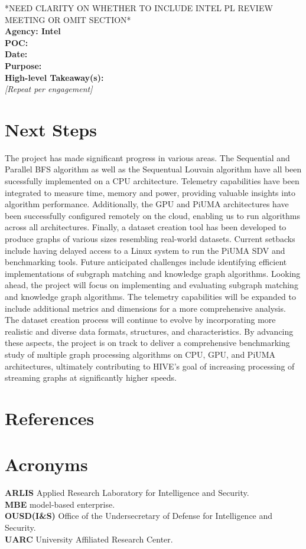 \documentclass[letterpaper, 10pt]{article}
\begin{document}
\begin{multicols}{2}
        *NEED CLARITY ON WHETHER TO INCLUDE INTEL PL REVIEW MEETING OR OMIT SECTION*\\
        \textbf{Agency: Intel} \\  
        \textbf{POC:}  \\
        \textbf{Date:} \\
        \textbf{Purpose:} \\
        \textbf{High-level Takeaway(s):} \\ 
        \textit{[Repeat per engagement]} 

    \section{Next Steps}
        The project has made significant progress in various areas. The Sequential and Parallel BFS algorithm as well as the Sequentual Louvain algorithm have all been sucessfully implemented on a CPU architecture. Telemetry capabilities have been integrated to measure time, memory and power, providing valuable insights into algorithm performance. Additionally, the GPU and PiUMA architectures have been successfully configured remotely on the cloud, enabling us to run algorithms across all architectures. Finally, a dataset creation tool has been developed to produce graphs of various sizes resembling real-world datasets. Current setbacks include having delayed access to a Linux system to run the PiUMA SDV and benchmarking tools. Future anticipated challenges include identifying efficient implementations of subgraph matching and knowledge graph algorithms. Looking ahead, the project will focus on implementing and evaluating subgraph matching and knowledge graph algorithms. The telemetry capabilities will be expanded to include additional metrics and dimensions for a more comprehensive analysis. The dataset creation process will continue to evolve by incorporating more realistic and diverse data formats, structures, and characteristics. By advancing these aspects, the project is on track to deliver a comprehensive benchmarking study of multiple graph processing algorithms on CPU, GPU, and PiUMA architectures, ultimately contributing to HIVE's goal of increasing processing of streaming graphs at significantly higher speeds. 
    \section{References}
        \printbibliography[heading=none]

    \section{Acronyms}
        \textbf{ARLIS} Applied Research Laboratory for Intelligence and Security.\\ 
        \textbf{MBE} model-based enterprise. \\
        \textbf{OUSD(I\&S)} Office of the Undersecretary of Defense for  Intelligence and Security. \\
        \textbf{UARC} University Affiliated Research Center.\\
    \end{multicols}
    \newpage
\end{document}
